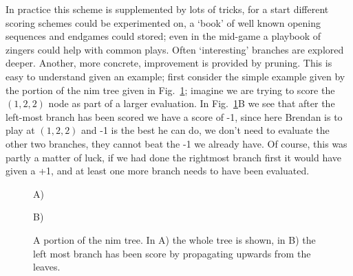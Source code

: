 \documentclass[11pt,a4paper]{scrartcl}
\begin{document}
{In practice this scheme is supplemented by lots of tricks, for a start
different scoring schemes could be experimented on, a \lq{}book\rq{}
of well known opening sequences and endgames could stored; even in the
mid-game a playbook of zingers could help with common plays. Often
\lq{}interesting\rq{} branches are explored deeper. Another, more concrete,
improvement is provided by pruning. This is easy to understand given
an example; first consider the simple example given by the portion of
the nim tree given in Fig.~\ref{fig:nim-alpha-beta}; imagine we are
trying to score the $(1,2,2)$ node as part of a larger evaluation. In
Fig.~\ref{fig:nim-alpha-beta}B we see that after the left-most branch
has been scored we have a score of -1, since here Brendan is to play
at $(1,2,2)$ and -1 is the best he can do, we don't need to evaluate
the other two branches, they cannot beat the -1 we already have. Of
course, this was partly a matter of luck, if we had done the rightmost
branch first it would have given a +1, and at least one more branch
needs to have been evaluated.

\begin{figure}
A)
\begin{center}
\end{center}
B)
\begin{center}
\end{center}
\caption{A portion of the nim tree. In A) the whole tree is shown, in
  B) the left most branch has been score by propagating upwards from
  the leaves.\label{fig:nim-alpha-beta}}
\end{figure}

}
\end{document}
